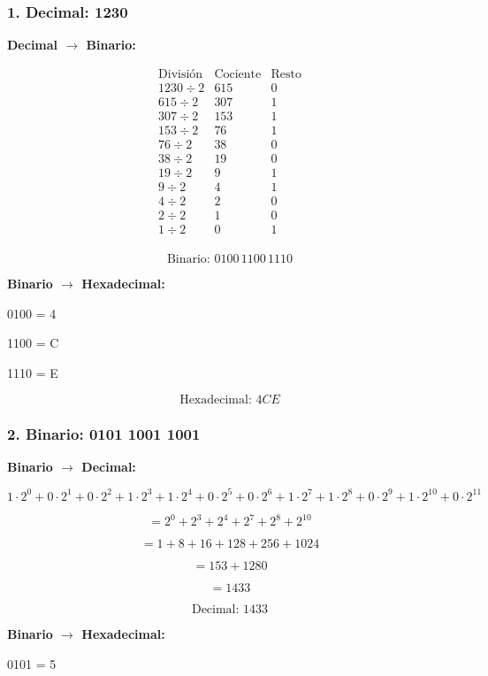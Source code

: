\subsubsection*{1. Decimal: 1230}

\textbf{Decimal $\to$ Binario:}

\[
\begin{array}{c|c|c}
\text{División} & \text{Cociente} & \text{Resto} \\
\hline
1230 \div 2 & 615 & 0 \\
615 \div 2 & 307 & 1 \\
307 \div 2 & 153 & 1 \\
153 \div 2 & 76 & 1 \\
76 \div 2 & 38 & 0 \\
38 \div 2 & 19 & 0 \\
19 \div 2 & 9 & 1 \\
9 \div 2 & 4 & 1 \\
4 \div 2 & 2 & 0 \\
2 \div 2 & 1 & 0 \\
1 \div 2 & 0 & 1 \\
\end{array}
\]

\[
\text{Binario: } 0100\,1100\,1110
\]

\textbf{Binario $\to$ Hexadecimal:}

0100 = 4

1100 = C

1110 = E

\[
\text{Hexadecimal: } 4CE
\]

\subsubsection*{2. Binario: 0101 1001 1001}

\textbf{Binario $\to$ Decimal:}

\[
1\cdot2^0+0\cdot2^1+0\cdot2^2+1\cdot2^3+ 1\cdot2^4+0\cdot2^5+0\cdot2^6+1\cdot2^7 +1\cdot2^8+0\cdot2^9+1\cdot2^{10}+0\cdot2^{11} 
\]

\[
 = 2^0 + 2^3 + 2^4 + 2^7 + 2^8+2^{10}
\]

\[
 = 1 + 8 + 16 + 128 + 256 + 1024 
\]

\[
 = 153 + 1280  
\]

\[
 = 1433  
\]

\[
\text{Decimal: } 1433
\]

\textbf{Binario $\to$ Hexadecimal:}

0101 = 5

